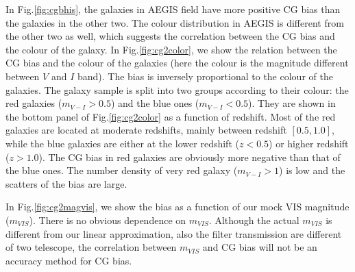 \documentclass[useAMS,usenatbib]{mn2e}
\begin{document}
In Fig.\ref{fig:cgbhis}, the galaxies in AEGIS field have more
positive CG bias than the galaxies in the other two. The colour
distribution in AEGIS is different from the other two as well, which
suggests the correlation between the CG bias and the colour of the
galaxy. In Fig.\ref{fig:cg2color}, we show the relation between the CG
bias and the colour of the galaxies (here the colour is the magnitude
different between $V$ and $I$ band). The bias is inversely
proportional to the colour of the galaxies. The galaxy sample is split
into two groups according to their colour: the red galaxies
($m_{V-I}>0.5$) and the blue ones ($m_{V-I}<0.5$). They are shown in
the bottom panel of Fig.\ref{fig:cg2color} as a function of
redshift. Most of the red galaxies are located at moderate redshifts,
mainly between redshift $[0.5,1.0]$, while the blue galaxies are
either at the lower redshift ($z<0.5$) or higher redshift
($z>1.0$). The CG bias in red galaxies are obviously more negative
than that of the blue ones. The number density of very red galaxy 
($m_{V-I}>1$) is low and the scatters of the bias are large.

In Fig.\ref{fig:cg2magvis}, we show the bias as a function of our mock VIS
magnitude ($m_{VIS}$). There is no obvious dependence on $m_{VIS}$. Although
the actual $m_{VIS}$ is different from our linear approximation, also
the filter transmission are different of two telescope, the correlation
between $m_{VIS}$ and CG bias will not be an accuracy method for CG bias.
\end{document}
